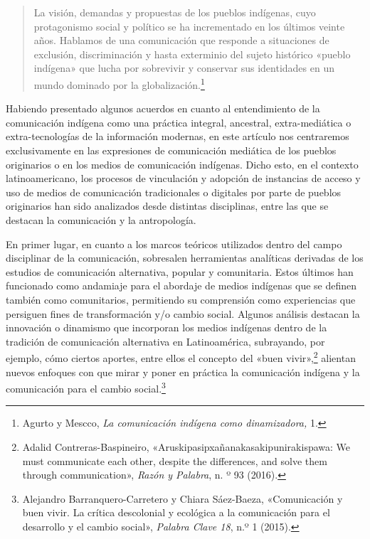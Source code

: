\documentclass{tufte-handout}
\begin{document}
\begin{quote}
La visión, demandas y propuestas de los pueblos indígenas, cuyo
protagonismo social y político se ha incrementado en los últimos veinte
años. Hablamos de una comunicación que responde a situaciones de
exclusión, discriminación y hasta exterminio del sujeto histórico
«pueblo indígena» que lucha por sobrevivir y conservar sus identidades
en un mundo dominado por la globalización.\footnote{Agurto y Mescco,
  \emph{La comunicación indígena como dinamizadora,} 1.}
\end{quote}

\noindent Habiendo presentado algunos acuerdos en cuanto al entendimiento de la
comunicación indígena como una práctica integral, ancestral,
extra-mediática o extra-tecnologías de la información modernas, en este
artículo nos centraremos exclusivamente en las expresiones de
comunicación mediática de los pueblos originarios o en los medios de
comunicación indígenas. Dicho esto, en el contexto latinoamericano, los
procesos de vinculación y adopción de instancias de acceso y uso de
medios de comunicación tradicionales o digitales por parte de pueblos
originarios han sido analizados desde distintas disciplinas, entre las
que se destacan la comunicación y la antropología.

En primer lugar, en cuanto a los marcos teóricos utilizados dentro del
campo disciplinar de la comunicación, sobresalen herramientas analíticas
derivadas de los estudios de comunicación alternativa, popular y
comunitaria. Estos últimos han funcionado como andamiaje para el
abordaje de medios indígenas que se definen también como comunitarios,
permitiendo su comprensión como experiencias que persiguen fines de
transformación y/o cambio social. Algunos análisis destacan la
innovación o dinamismo que incorporan los medios indígenas dentro de la
tradición de comunicación alternativa en Latinoamérica, subrayando, por
ejemplo, cómo ciertos aportes, entre ellos el concepto del «buen
vivir»,\footnote{Adalid Contreras-Baspineiro,
  «Aruskipasipxañanakasakipunirakispawa: We must communicate each other,
  despite the differences, and solve them through communication»,
  \emph{Razón y Palabra}, n. º 93 (2016).} alientan nuevos enfoques con
que mirar y poner en práctica la comunicación indígena y la comunicación
para el cambio social.\footnote{Alejandro Barranquero-Carretero y Chiara
  Sáez-Baeza, «Comunicación y buen vivir. La crítica descolonial y
  ecológica a la comunicación para el desarrollo y el cambio social»,
  \emph{Palabra Clave 18}, n.º 1 (2015).}
\end{document}
